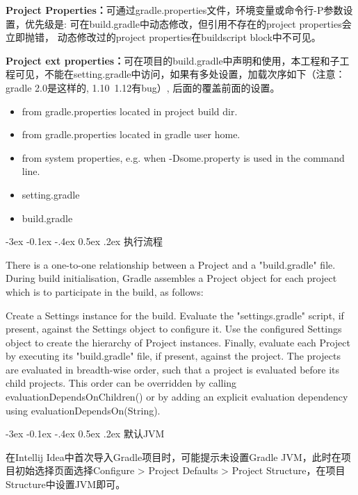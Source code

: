 \documentclass[12pt]{book}
\makeatletter
\numberwithin{dummy}{section}
\theoremstyle{ocrenumbox}
\theoremstyle{blacknumex}
\theoremstyle{blacknumbox}
\theoremstyle{ocrenum}
\renewcommand{\subsection}{\@startsection {subsection}{2}{\z@}
	{-3ex \@plus -0.1ex \@minus -.4ex}
	{0.5ex \@plus.2ex }
	{\normalfont\sffamily\bfseries}}
\makeatother
\begin{document}
\textbf{Project Properties：}可通过gradle.properties文件，环境变量或命令行-P参数设置，优先级是:
可在build.gradle中动态修改，但引用不存在的project properties会立即抛错，
动态修改过的project properties在buildscript block中不可见。

\textbf{Project ext properties：}可在项目的build.gradle中声明和使用，本工程和子工程可见，不能在setting.gradle中访问，如果有多处设置，加载次序如下（注意：gradle 2.0是这样的, 1.10~1.12有bug）, 后面的覆盖前面的设置。

\begin{itemize}
	\item {from gradle.properties located in project build dir.}
	\item {from gradle.properties located in gradle user home.}
	\item {from system properties, e.g. when -Dsome.property is used in the command line.}
	\item {setting.gradle}
	\item {build.gradle}
\end{itemize}


\subsection{执行流程}

There is a one-to-one relationship between a Project and a "build.gradle" file. During build initialisation, Gradle assembles a Project object for each project which is to participate in the build, as follows:

Create a Settings instance for the build.
Evaluate the "settings.gradle" script, if present, against the Settings object to configure it.
Use the configured Settings object to create the hierarchy of Project instances.
Finally, evaluate each Project by executing its "build.gradle" file, if present, against the project. The projects are evaluated in breadth-wise order, such that a project is evaluated before its child projects. This order can be overridden by calling evaluationDependsOnChildren() or by adding an explicit evaluation dependency using evaluationDependsOn(String).

\subsection{默认JVM}

在Intellij Idea中首次导入Gradle项目时，可能提示未设置Gradle JVM，此时在项目初始选择页面选择Configure > Project Defaults > Project Structure，在项目Structure中设置JVM即可。
\end{document}

